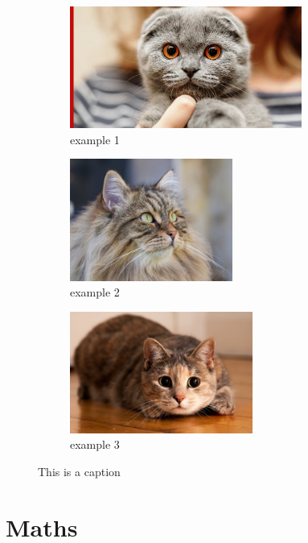\documentclass[10pt,a4paper]{report}
\begin{document}
\begin{figure}[h]
    \centering
    \begin{subfigure}{0.3\textwidth}
    \includegraphics[width=1\linewidth, height=4cm]{photos/906045-fb.jpeg}
    \caption{example 1}
    \label{fig:sub1}
    \end{subfigure}
    \begin{subfigure}{0.3\textwidth}
    \includegraphics[width=1\linewidth, height=4cm]{photos/MicrosoftTeams-image (6) (1)_1.jpg}
    \caption{example 2}
    \label{fig:sub2}
    \end{subfigure}
    \begin{subfigure}{0.3\textwidth}
    \includegraphics[width=1\linewidth, height=4cm]{photos/aHR0cDovL3d3dy5saXZlc2N.jpg}
    \caption{example 3}
    \label{fig:sub3}
    \end{subfigure}
    \caption{This is a caption}
\caption{}
\label{fig:figure1}
\end{figure} 

\chapter{Maths}
\end{document}
